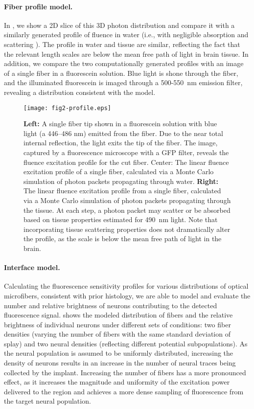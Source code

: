 \paragraph{Fiber profile model.} In , we show a 2D slice of this 3D photon distribution and compare it with a similarly generated profile of fluence in water (i.e., with negligible absorption and scattering \cite{DandAInstrumentCompanytextLindaWorltonlayout:2008vo}). The profile in water and tissue are similar, reflecting the fact that the relevant length scales are below the mean free path of light in brain tissue. In addition, we compare the two computationally generated profiles with an image of a single fiber in a fluorescein solution. Blue light is shone through the fiber, and the illuminated fluorescein is imaged through a 500-550~nm emission filter, revealing a distribution consistent with the model.

\begin{figure}
\texttt{[image: fig2-profile.eps]}
\caption[Comparison of light profile with model results]{\textbf{Left:} A single fiber tip shown in a fluorescein solution with blue light (a 446--486 nm) emitted from the fiber. Due to the near total internal reflection, the light exits the tip of the fiber. The image, captured by a fluorescence microscope with a GFP filter, reveals the fluence excitation profile for the cut fiber. Center: The linear fluence excitation profile of a single fiber, calculated via a Monte Carlo simulation of photon packets propagating through water. \textbf{Right:} The linear fluence excitation profile from a single fiber, calculated via a Monte Carlo simulation of photon packets propagating through the tissue. At each step, a photon packet may scatter or be absorbed based on tissue properties estimated for 490~nm light. Note that incorporating tissue scattering properties does not dramatically alter the profile, as the scale is below the mean free path of light in the brain.}
\label{fig:profile}
\end{figure}

\paragraph{Interface model.} Calculating the fluorescence sensitivity profiles for various distributions of optical microfibers, consistent with prior histology, we are able to model and evaluate the number and relative brightness of neurons contributing to the detected fluorescence signal.  shows the modeled distribution of fibers and the relative brightness of individual neurons under different sets of conditions: two fiber densities (varying the number of fibers with the same standard deviation of splay) and two neural densities (reflecting different potential subpopulations). As the neural population is assumed to be uniformly distributed, increasing the density of neurons results in an increase in the number of neural traces being collected by the implant. Increasing the number of fibers has a more pronounced effect, as it increases the magnitude and uniformity of the excitation power delivered to the region and achieves a more dense sampling of fluorescence from the target neural population.



